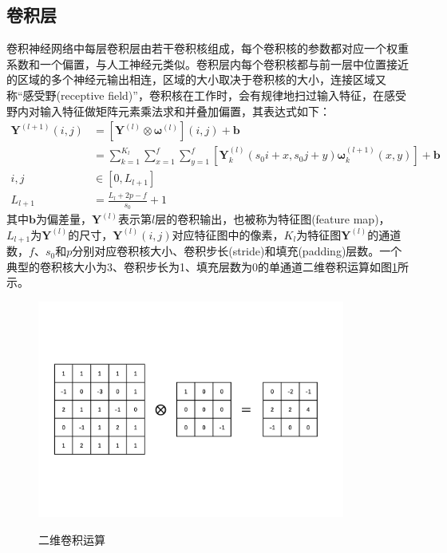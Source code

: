 \documentclass[a4paper]{ctexart}
\begin{document}
\begin{spacing}{1.3}
	\subsection{卷积层}
	卷积神经网络中每层卷积层由若干卷积核组成，每个卷积核的参数都对应一个权重系数和一个偏置，与人工神经元类似。卷积层内每个卷积核都与前一层中位置接近的区域的多个神经元输出相连，区域的大小取决于卷积核的大小，连接区域又称“感受野(receptive field)”，卷积核在工作时，会有规律地扫过输入特征，在感受野内对输入特征做矩阵元素乘法求和并叠加偏置，其表达式如下\cite{RN136}：
	\begin{equation}
		\begin{split}
			\bm Y^{(l+1)}\left(i,j\right)&=\left[\bm Y^{(l)}\otimes\bm\omega^{(l)}\right]\left(i,j\right)+\bm b\\
			&=\sum_{k=1}^{K_l}\sum_{x=1}^f\sum_{y=1}^f\left[\bm Y_{k}^{(l)}(s_0i+x,s_0j+y)\bm\omega_{k}^{(l+1)}(x,y)\right]+\bm{b}\\
			i,j&\in\left[0,L_{l+1}\right]\\
			L_{l+1}&=\frac{L_l+2p-f}{s_0}+1
		\end{split}
	\end{equation}
	其中$\bm b$为偏差量，$\bm Y^{(l)}$表示第$l$层的卷积输出，也被称为特征图(feature map)，$L_{l+1}$为$\bm Y^{(l)}$的尺寸，$\bm Y^{(l)}(i,j)$对应特征图中的像素，$K_l$为特征图$\bm Y^{(l)}$的通道数，$f$、$s_0$和$p$分别对应卷积核大小、卷积步长(stride)和填充(padding)层数\cite{RN136}。一个典型的卷积核大小为3、卷积步长为1、填充层数为0的单通道二维卷积运算如图\ref{figure:二维卷积运算}所示。
	\begin{figure}[htbp]
		\centering
		\includegraphics[width=0.9\textwidth, keepaspectratio]{figure/conv.pdf}\\
		\caption{二维卷积运算}\label{figure:二维卷积运算}
	\end{figure}


\end{spacing}
\end{document}
